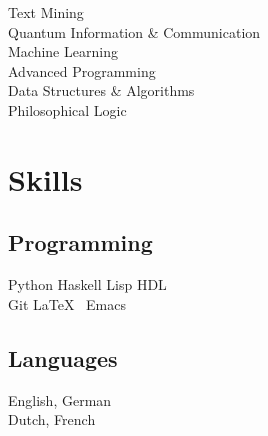 \documentclass[letterpaper]{deedy-resume} %
\begin{document}
\begin{minipage}[t]{0.33\textwidth}
Text Mining \\
Quantum Information \& Communication\\
Machine Learning\\
Advanced Programming\\
Data Structures \& Algorithms \\

Philosophical Logic\\

\sectionspace %


\section{Skills}

\subsection{Programming}

Python \textbullet{} Haskell \textbullet{} Lisp\textbullet{} HDL\textbullet{} %
\\
Git \textbullet{}\LaTeX\ \textbullet{} Emacs
\sectionspace %

\subsection{Languages}
English, German
\\
Dutch, French

\end{minipage} %
\hfill
%
%
\end{document}

